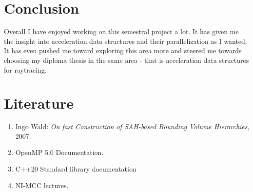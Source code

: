 \documentclass[10pt,a4paper,twocolumn]{article}
\begin{document}
\section{Conclusion}

Overall I have enjoyed working on this semestral project a lot. It has given me the insight into acceleration data structures and their parallelization as I wanted. It has even pushed me toward exploring this area more and steered me towards choosing my diploma thesis in the same area - that is acceleration data structures for raytracing.

\section{Literature}
\begin{enumerate}
    \item Ingo Wald: \textit{On fast Construction of SAH-based Bounding Volume Hierarchies}, 2007.
    \item OpenMP 5.0 Documentation.
    \item C++20 Standard library documentation
    \item NI-MCC lectures.
\end{enumerate}
\end{document}

